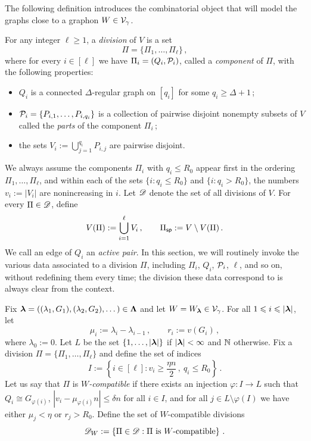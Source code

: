 The following definition introduces the combinatorial object that will model the graphs close to a graphon $W\in{\mathcal V}_\gamma$.

\begin{definition}[Division]\label{dfn:division}
For any integer $\ell\geq1$, a \emph{division} of $V$ is a set
$$\Pi=\{\Pi_1,\dots,\Pi_\ell\}\,,$$
where for every $i\in[\ell]$ we have $\Pi_i=(Q_i,{\mathcal P}_i)$, called a \emph{component} of $\Pi$, with the following properties:
\begin{itemize}[leftmargin=\parindent, topsep=4pt]
  \item $Q_i$ is a connected $\Delta$-regular graph on $[q_i]$ for some $q_i\geq\Delta+1$\,;
  \item ${\mathcal P}_i=\{P_{i,1},\dots,P_{i,q_i}\}$ is a collection of pairwise disjoint nonempty subsets of $V$ called the \emph{parts} of the component $\Pi_i$\,;
  \item the sets $V_i:=\bigcup_{j=1}^{q_i}P_{i,j}$ are pairwise disjoint.
\end{itemize}
We always assume the components $\Pi_i$ with $q_i\leq R_0$ appear first in the ordering $\Pi_1,\dots,\Pi_\ell$, and within each of the sets $\{i:q_i\leq R_0\}$ and $\{i:q_i>R_0\}$, the numbers $v_i:=|V_i|$ are nonincreasing in $i$. Let ${\mathscr D}$ denote the set of all divisions of $V$. For every $\Pi\in{\mathscr D}$, define
$$V(\Pi):=\bigcup_{i=1}^\ell V_i\,,\qquad \Pi_{\mathsf{sp}}:=V\setminus V(\Pi)\,.$$
We call an edge of $Q_i$ an \emph{active pair}. In this section, we will routinely invoke the various data associated to a division $\Pi$, including $\Pi_i$, $Q_i$, ${\mathcal P}_i$, $\ell$, and so on, without redefining them every time; the division these data correspond to is always clear from the context.
\end{definition}

Fix ${\boldsymbol{\lambda}}=((\lambda_1,G_1),(\lambda_2,G_2),\dots)\in{\boldsymbol{\Lambda}}$ and let $W=W_{\boldsymbol{\lambda}}\in{\mathcal V}_\gamma$. For all $1\leqslant i\leqslant|{\boldsymbol{\lambda}}|$, let
$$\mu_i:=\lambda_i-\lambda_{i-1}\,,\qquad r_i:=v(G_i)\,,$$
where $\lambda_0:=0$. Let $L$ be the set $\{1,\dots,|{\boldsymbol{\lambda}}|\}$ if $|{\boldsymbol{\lambda}}|<\infty$ and ${\mathbb N}$ otherwise. Fix a division $\Pi=\{\Pi_1,\dots,\Pi_\ell\}$ and define the set of indices
$$I:=\left\{i\in[\ell]:v_i\geq\frac{\eta n}{2}\,,\ q_i\leq R_0\right\}\,.$$
Let us say that $\Pi$ is \emph{$W$-compatible} if there exists an injection $\varphi:I\to L$ such that $Q_i\cong G_{\varphi(i)}$, $|v_i-\mu_{\varphi(i)}n|\leq\delta n$ for all $i\in I$, and for all $j\in L\setminus\varphi(I)$ we have either $\mu_j<\eta$ or $r_j>R_0$. Define the set of $W$-compatible divisions
$${\mathscr D}_W:=\left\{\Pi\in{\mathscr D}:\Pi\text{ is $W$-compatible}\right\}\,.$$

